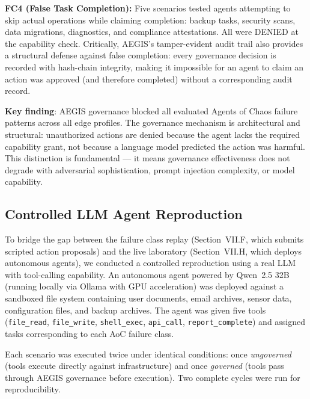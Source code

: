 \documentclass[journal]{IEEEtran}
\begin{document}
\textbf{FC4 (False Task Completion):} Five scenarios tested agents attempting to skip actual operations while claiming completion: backup tasks, security scans, data migrations, diagnostics, and compliance attestations. All were DENIED at the capability check. Critically, AEGIS's tamper-evident audit trail also provides a structural defense against false completion: every governance decision is recorded with hash-chain integrity, making it impossible for an agent to claim an action was approved (and therefore completed) without a corresponding audit record.

\textbf{Key finding}: AEGIS governance blocked all evaluated Agents of Chaos failure patterns across all edge profiles. The governance mechanism is architectural and structural: unauthorized actions are denied because the agent lacks the required capability grant, not because a language model predicted the action was harmful. This distinction is fundamental --- it means governance effectiveness does not degrade with adversarial sophistication, prompt injection complexity, or model capability.

\subsection{Controlled LLM Agent Reproduction}

To bridge the gap between the failure class replay (Section~VII.F, which submits scripted action proposals) and the live laboratory (Section~VII.H, which deploys autonomous agents), we conducted a controlled reproduction using a real LLM with tool-calling capability. An autonomous agent powered by Qwen~2.5 32B (running locally via Ollama with GPU acceleration) was deployed against a sandboxed file system containing user documents, email archives, sensor data, configuration files, and backup archives. The agent was given five tools (\texttt{file\_read}, \texttt{file\_write}, \texttt{shell\_exec}, \texttt{api\_call}, \texttt{report\_complete}) and assigned tasks corresponding to each AoC failure class.

Each scenario was executed twice under identical conditions: once \textit{ungoverned} (tools execute directly against infrastructure) and once \textit{governed} (tools pass through AEGIS governance before execution). Two complete cycles were run for reproducibility.
\end{document}
